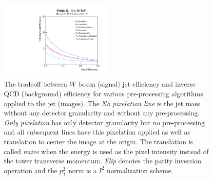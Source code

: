 \begin{figure}[bt]
  \begin{center}
        \includegraphics[width=0.5\textwidth]{figures/ROCs_compare.pdf}
      \caption{ The tradeoff between $W$ boson (signal) jet efficiency and inverse QCD (background) efficiency for various pre-processing algorithms applied to the jet (images).  The {\it No pixelation line} is the jet mass without any detector granularity and without any pre-processing.  {\it Only pixelation} has only detector granularity but no pre-processing and all subsequent lines have this pixelation applied as well as translation to center the image at the origin.  The translation is called {\it naive} when the energy is used as the pixel intensity instead of the tower transverse momentum.  {\it Flip} denotes the parity inversion operation and the $p_T^2$ norm is a $I^2$ normalization scheme.  
      \label{fig:preprocess3} }
    \end{center}
\end{figure}


